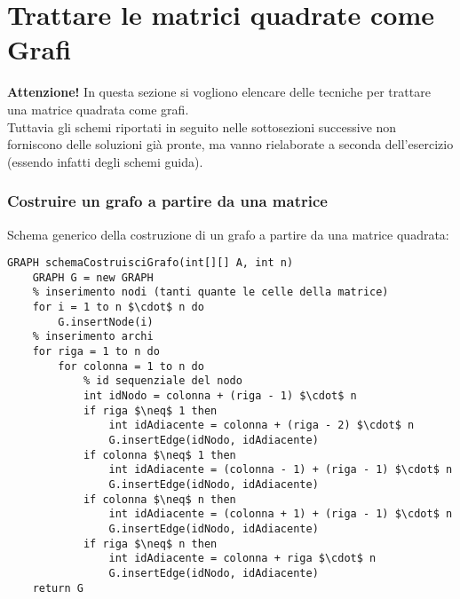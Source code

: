 \documentclass[../cheatSheetAlgoritmi.tex]{subfiles}
\begin{document}
\chapter{Trattare le matrici quadrate come Grafi}
\textbf{Attenzione!} In questa sezione si vogliono elencare delle tecniche per trattare una matrice quadrata come grafi. \\Tuttavia gli schemi riportati in seguito nelle sottosezioni successive non forniscono delle soluzioni già pronte, ma vanno rielaborate a seconda dell'esercizio (essendo infatti degli schemi guida).
\subsection{Costruire un grafo a partire da una matrice}
Schema generico della costruzione di un grafo a partire da una matrice quadrata:
\begin{lstlisting}[caption=Schema costruzione Grafo da una matrice]
GRAPH schemaCostruisciGrafo(int[][] A, int n)
	GRAPH G = new GRAPH
  	% inserimento nodi (tanti quante le celle della matrice)
  	for i = 1 to n $\cdot$ n do
  		G.insertNode(i)
  	% inserimento archi
  	for riga = 1 to n do
    	for colonna = 1 to n do
      		% id sequenziale del nodo
      		int idNodo = colonna + (riga - 1) $\cdot$ n
      		if riga $\neq$ 1 then 
        		int idAdiacente = colonna + (riga - 2) $\cdot$ n
        		G.insertEdge(idNodo, idAdiacente)
      		if colonna $\neq$ 1 then
        		int idAdiacente = (colonna - 1) + (riga - 1) $\cdot$ n
        		G.insertEdge(idNodo, idAdiacente)
      		if colonna $\neq$ n then
        		int idAdiacente = (colonna + 1) + (riga - 1) $\cdot$ n
        		G.insertEdge(idNodo, idAdiacente)
      		if riga $\neq$ n then
        		int idAdiacente = colonna + riga $\cdot$ n
        		G.insertEdge(idNodo, idAdiacente)
  	return G
\end{lstlisting}
\end{document}
